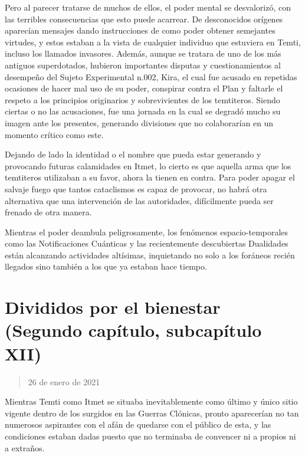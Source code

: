 \documentclass[
  spanish,
]{book}
\begin{document}
Pero al parecer tratarse de muchos de ellos, el poder mental se desvalorizó, con las terribles consecuencias que esto puede acarrear.
De desconocidos orígenes aparecían mensajes dando instrucciones de como poder obtener semejantes virtudes, y estos estaban a la vista de cualquier individuo que estuviera en Temti, incluso los llamados invasores. Además, aunque se tratara de uno de los más antiguos superdotados, hubieron importantes disputas y cuestionamientos al desempeño del Sujeto Experimental n.002, Kira, el cual fue acusado en repetidas ocasiones de hacer mal uso de su poder, conspirar contra el Plan y faltarle el respeto a los principios originarios y sobrevivientes de los temtiteros.
Siendo ciertas o no las acusaciones, fue una jornada en la cual se degradó mucho su imagen ante los presentes, generando divisiones que no colaborarían en un momento crítico como este.

Dejando de lado la identidad o el nombre que pueda estar generando y provocando futuras calamidades en Itmet, lo cierto es que aquella arma que los temtiteros utilizaban a su favor, ahora la tienen en contra. Para poder apagar el salvaje fuego que tantos cataclismos es capaz de provocar, no habrá otra alternativa que una intervención de las autoridades, difícilmente pueda ser frenado de otra manera.

Mientras el poder deambula peligrosamente, los fenómenos espacio-temporales como las Notificaciones Cuánticas y las recientemente descubiertas Dualidades están alcanzando actividades altísimas, inquietando no solo a los foráneos recién llegados sino también a los que ya estaban hace tiempo.

\hypertarget{divididos-por-el-bienestar-segundo-capuxedtulo-subcapuxedtulo-xii}{%
\section{Divididos por el bienestar (Segundo capítulo, subcapítulo XII)}\label{divididos-por-el-bienestar-segundo-capuxedtulo-subcapuxedtulo-xii}}

\begin{quote}
26 de enero de 2021
\end{quote}

Mientras Temti como Itmet se situaba inevitablemente como último y único sitio vigente dentro de los surgidos en las Guerras Clónicas, pronto aparecerían no tan numerosos aspirantes con el afán de quedarse con el público de esta, y las condiciones estaban dadas puesto que no terminaba de convencer ni a propios ni a extraños.
\end{document}
